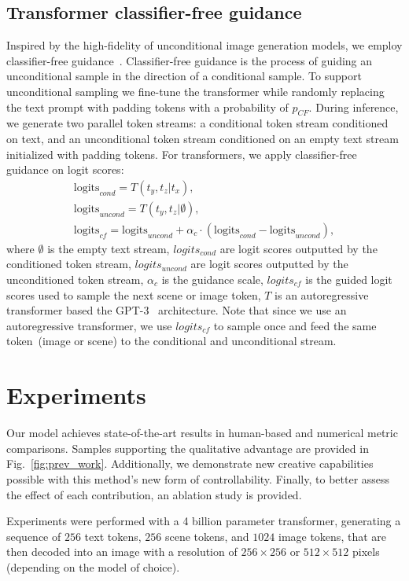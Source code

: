 \documentclass[final]{cvpr}
\begin{document}
\subsection{Transformer classifier-free guidance}
Inspired by the high-fidelity of unconditional image generation models, we employ classifier-free guidance~\cite{transformerCF,ho2021classifier,radford2021learning}. Classifier-free guidance is the process of guiding an unconditional sample in the direction of a conditional sample. To support unconditional sampling we fine-tune the transformer while randomly replacing the text prompt with padding tokens with a probability of $p_{CF}$. During inference, we generate two parallel token streams: a conditional token stream conditioned on text, and an unconditional token stream conditioned on an empty text stream initialized with padding tokens. For transformers, we apply classifier-free guidance on logit scores:
\begin{gather*}
    \text{logits}_{cond} = T(t_y,t_z | t_x), \\
    \text{logits}_{uncond} = T(t_y, t_z | \emptyset), \\
    \text{logits}_{cf} = \text{logits}_{uncond} + \alpha_c \cdot (\text{logits}_{cond} - \text{logits}_{uncond}),
    \label{eq:cf}
\end{gather*}
where $\emptyset$ is the empty text stream, $logits_{cond}$ are logit scores outputted by the conditioned token stream, $logits_{uncond}$ are logit scores outputted by the unconditioned token stream, $\alpha_c$ is the guidance scale, $logits_{cf}$ is the guided logit scores used to sample the next scene or image token, $T$ is an autoregressive transformer based the GPT-3~\cite{brown2020language} architecture. Note that since we use an autoregressive transformer, we use $logits_{cf}$ to sample once and feed the same token~(image or scene) to the conditional and unconditional stream.

\section{Experiments}
Our model achieves state-of-the-art results in human-based and numerical metric comparisons. Samples supporting the qualitative advantage are provided in Fig.~\ref{fig:prev_work}. Additionally, we demonstrate new creative capabilities possible with this method's new form of controllability. Finally, to better assess the effect of each contribution, an ablation study is provided. 

Experiments were performed with a 4 billion parameter transformer, generating a sequence of $256$ text tokens, $256$ scene tokens, and $1024$ image tokens, that are then decoded into an image with a resolution of $256\times256$ or $512\times512$ pixels (depending on the model of choice).
\end{document}
